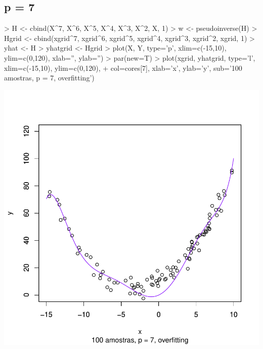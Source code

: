 \documentclass{article}
\begin{document}
\subsection{p = 7}
\begin{Schunk}
\begin{Sinput}
> H <- cbind(X^7, X^6, X^5, X^4, X^3, X^2, X, 1)
> w <- pseudoinverse(H) %
> Hgrid <- cbind(xgrid^7, xgrid^6, xgrid^5, xgrid^4, xgrid^3, xgrid^2, xgrid, 1)
> yhat <- H %
> yhatgrid <- Hgrid %
> plot(X, Y, type='p', xlim=c(-15,10), ylim=c(0,120), xlab='', ylab='')
> par(new=T)
> plot(xgrid, yhatgrid, type='l', xlim=c(-15,10), ylim=c(0,120),
+      col=cores[7], xlab='x', ylab='y', sub='100 amostras, p = 7, overfitting')
\end{Sinput}
\end{Schunk}
\includegraphics{aprox-017}
\end{document}
